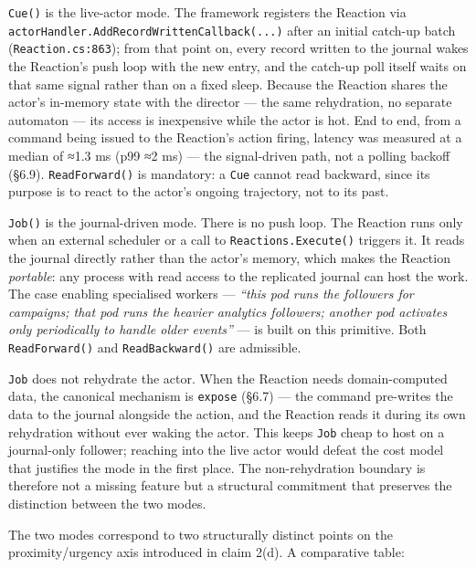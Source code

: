 \documentclass[
]{article}
\let\origtexttt\texttt%
\renewcommand{\texttt}[1]{\origtexttt{\seqsplit{#1}}}%
\let\texttt\origtexttt%
\begin{document}
\texttt{Cue()} is the live-actor mode. The framework registers the
Reaction via \texttt{actorHandler.AddRecordWrittenCallback(...)} after
an initial catch-up batch (\texttt{Reaction.cs:863}); from that point
on, every record written to the journal wakes the Reaction's push loop
with the new entry, and the catch-up poll itself waits on that same
signal rather than on a fixed sleep. Because the Reaction shares the
actor's in-memory state with the director --- the same rehydration, no
separate automaton --- its access is inexpensive while the actor is hot.
End to end, from a command being issued to the Reaction's action firing,
latency was measured at a median of ≈1.3 ms (p99 ≈2 ms) --- the
signal-driven path, not a polling backoff (§6.9). \texttt{ReadForward()}
is mandatory: a \texttt{Cue} cannot read backward, since its purpose is
to react to the actor's ongoing trajectory, not to its past.

\texttt{Job()} is the journal-driven mode. There is no push loop. The
Reaction runs only when an external scheduler or a call to
\texttt{Reactions.Execute()} triggers it. It reads the journal directly
rather than the actor's memory, which makes the Reaction
\emph{portable}: any process with read access to the replicated journal
can host the work. The case enabling specialised workers ---
\emph{``this pod runs the followers for campaigns; that pod runs the
heavier analytics followers; another pod activates only periodically to
handle older events''} --- is built on this primitive. Both
\texttt{ReadForward()} and \texttt{ReadBackward()} are admissible.

\texttt{Job} does not rehydrate the actor. When the Reaction needs
domain-computed data, the canonical mechanism is \texttt{expose} (§6.7)
--- the command pre-writes the data to the journal alongside the action,
and the Reaction reads it during its own rehydration without ever waking
the actor. This keeps \texttt{Job} cheap to host on a journal-only
follower; reaching into the live actor would defeat the cost model that
justifies the mode in the first place. The non-rehydration boundary is
therefore not a missing feature but a structural commitment that
preserves the distinction between the two modes.

The two modes correspond to two structurally distinct points on the
proximity/urgency axis introduced in claim 2(d). A comparative table:
\end{document}
